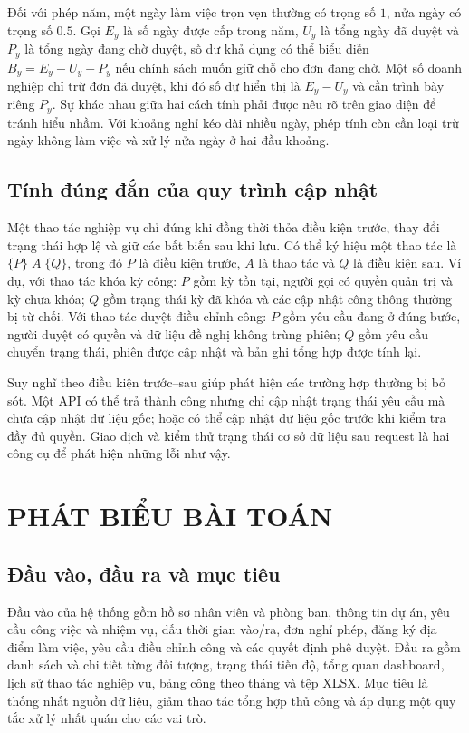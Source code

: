 \documentclass[12pt,a4paper,oneside]{report}
\begin{document}
Đối với phép năm, một ngày làm việc trọn vẹn thường có trọng số $1$, nửa ngày có trọng số $0.5$. Gọi $E_y$ là số ngày được cấp trong năm, $U_y$ là tổng ngày đã duyệt và $P_y$ là tổng ngày đang chờ duyệt, số dư khả dụng có thể biểu diễn $B_y=E_y-U_y-P_y$ nếu chính sách muốn giữ chỗ cho đơn đang chờ. Một số doanh nghiệp chỉ trừ đơn đã duyệt, khi đó số dư hiển thị là $E_y-U_y$ và cần trình bày riêng $P_y$. Sự khác nhau giữa hai cách tính phải được nêu rõ trên giao diện để tránh hiểu nhầm. Với khoảng nghỉ kéo dài nhiều ngày, phép tính còn cần loại trừ ngày không làm việc và xử lý nửa ngày ở hai đầu khoảng.

\section{Tính đúng đắn của quy trình cập nhật}
Một thao tác nghiệp vụ chỉ đúng khi đồng thời thỏa điều kiện trước, thay đổi trạng thái hợp lệ và giữ các bất biến sau khi lưu. Có thể ký hiệu một thao tác là $\{P\}\;A\;\{Q\}$, trong đó $P$ là điều kiện trước, $A$ là thao tác và $Q$ là điều kiện sau. Ví dụ, với thao tác khóa kỳ công: $P$ gồm kỳ tồn tại, người gọi có quyền quản trị và kỳ chưa khóa; $Q$ gồm trạng thái kỳ đã khóa và các cập nhật công thông thường bị từ chối. Với thao tác duyệt điều chỉnh công: $P$ gồm yêu cầu đang ở đúng bước, người duyệt có quyền và dữ liệu đề nghị không trùng phiên; $Q$ gồm yêu cầu chuyển trạng thái, phiên được cập nhật và bản ghi tổng hợp được tính lại.

Suy nghĩ theo điều kiện trước--sau giúp phát hiện các trường hợp thường bị bỏ sót. Một API có thể trả thành công nhưng chỉ cập nhật trạng thái yêu cầu mà chưa cập nhật dữ liệu gốc; hoặc có thể cập nhật dữ liệu gốc trước khi kiểm tra đầy đủ quyền. Giao dịch và kiểm thử trạng thái cơ sở dữ liệu sau request là hai công cụ để phát hiện những lỗi như vậy.

\chapter{PHÁT BIỂU BÀI TOÁN}
\section{Đầu vào, đầu ra và mục tiêu}
Đầu vào của hệ thống gồm hồ sơ nhân viên và phòng ban, thông tin dự án, yêu cầu công việc và nhiệm vụ, dấu thời gian vào/ra, đơn nghỉ phép, đăng ký địa điểm làm việc, yêu cầu điều chỉnh công và các quyết định phê duyệt. Đầu ra gồm danh sách và chi tiết từng đối tượng, trạng thái tiến độ, tổng quan dashboard, lịch sử thao tác nghiệp vụ, bảng công theo tháng và tệp XLSX. Mục tiêu là thống nhất nguồn dữ liệu, giảm thao tác tổng hợp thủ công và áp dụng một quy tắc xử lý nhất quán cho các vai trò.
\end{document}
